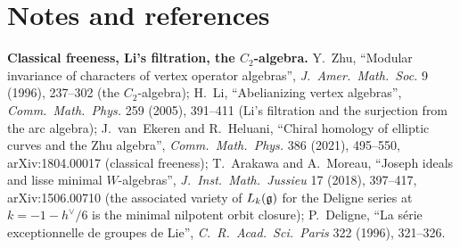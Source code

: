\section{Notes and references}\label{l27:sec:notes}

\textbf{Classical freeness, Li's filtration, the $C_2$-algebra.} Y.~Zhu, ``Modular invariance of characters of vertex operator
algebras'', \emph{J.\ Amer.\ Math.\ Soc.} 9 (1996), 237--302 (the $C_2$-algebra); H.~Li, ``Abelianizing vertex algebras'',
\emph{Comm.\ Math.\ Phys.} 259 (2005), 391--411 (Li's filtration and the surjection from the arc algebra); J.~van~Ekeren and R.~Heluani,
``Chiral homology of elliptic curves and the Zhu algebra'', \emph{Comm.\ Math.\ Phys.} 386 (2021), 495--550, arXiv:1804.00017 (classical
freeness); T.~Arakawa and A.~Moreau, ``Joseph ideals and lisse minimal $W$-algebras'', \emph{J.\ Inst.\ Math.\ Jussieu} 17 (2018), 397--417,
arXiv:1506.00710 (the associated variety of $L_k(\mathfrak g)$ for the Deligne series at $k=-1-h^\vee/6$ is the minimal nilpotent orbit
closure); P.~Deligne, ``La s\'erie exceptionnelle de groupes de Lie'', \emph{C.\ R.\ Acad.\ Sci.\ Paris} 322 (1996), 321--326.

